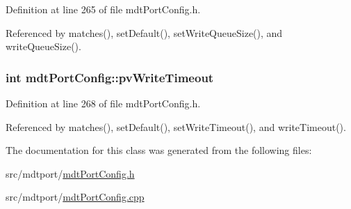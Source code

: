 Definition at line 265 of file mdt\-Port\-Config.\-h.



Referenced by matches(), set\-Default(), set\-Write\-Queue\-Size(), and write\-Queue\-Size().

\hypertarget{classmdt_port_config_ad840fd68971a9ccc6092ce2aa3167591}{
\subsubsection[{pv\-Write\-Timeout}]{\setlength{\rightskip}{0pt plus 5cm}int mdt\-Port\-Config\-::pv\-Write\-Timeout\hspace{0.3cm}{\ttfamily [protected]}}}\label{classmdt_port_config_ad840fd68971a9ccc6092ce2aa3167591}


Definition at line 268 of file mdt\-Port\-Config.\-h.



Referenced by matches(), set\-Default(), set\-Write\-Timeout(), and write\-Timeout().



The documentation for this class was generated from the following files\-:\begin{DoxyCompactItemize}
\item 
src/mdtport/\hyperlink{mdt_port_config_8h}{mdt\-Port\-Config.\-h}\item 
src/mdtport/\hyperlink{mdt_port_config_8cpp}{mdt\-Port\-Config.\-cpp}\end{DoxyCompactItemize}
